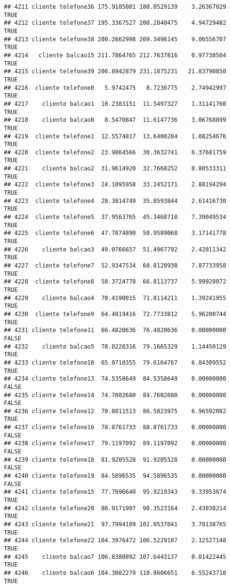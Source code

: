 \documentclass[
]{article}
\begin{document}
\begin{verbatim}
## 4211 cliente telefone36 175.9185081 180.0529139    3.26367029     TRUE
## 4212 cliente telefone37 195.3367527 200.2840475    4.94729482     TRUE
## 4213 cliente telefone38 200.2662998 209.3496145    9.06556707     TRUE
## 4214   cliente balcao15 211.7864765 212.7637816    0.97730504     TRUE
## 4215 cliente telefone39 206.8942879 231.1875231   21.83790850     TRUE
## 4216  cliente telefone0   5.9742475   8.7236775    2.74942997     TRUE
## 4217    cliente balcao1  10.2383151  11.5497327    1.31141760     TRUE
## 4218    cliente balcao0   8.5470847  11.6147736    3.06768899     TRUE
## 4219  cliente telefone1  12.5574817  13.6400284    1.08254676     TRUE
## 4220  cliente telefone2  23.9864566  30.3632741    6.37681759     TRUE
## 4221    cliente balcao2  31.9614920  32.7668252    0.80533311     TRUE
## 4222  cliente telefone3  24.1095958  33.2452171    2.88194294     TRUE
## 4223  cliente telefone4  28.3814749  35.8593844    2.61416730     TRUE
## 4224  cliente telefone5  37.9563765  45.3468718    7.39049534     TRUE
## 4225  cliente telefone6  47.7874890  50.9589068    3.17141778     TRUE
## 4226    cliente balcao3  49.0766657  51.4967792    2.42011342     TRUE
## 4227  cliente telefone7  52.9347534  60.8120930    7.87733958     TRUE
## 4228  cliente telefone8  58.3724778  66.8113737    5.99928072     TRUE
## 4229    cliente balcao4  70.4190015  71.8114211    1.39241955     TRUE
## 4230  cliente telefone9  64.4819416  72.7733812    5.96200744     TRUE
## 4231 cliente telefone11  66.4820636  76.4820636    0.00000000    FALSE
## 4232    cliente balcao5  78.0220316  79.1665329    1.14450129     TRUE
## 4233 cliente telefone10  65.0710355  79.6164767    6.84309552     TRUE
## 4234 cliente telefone13  74.5358649  84.5358649    0.00000000    FALSE
## 4235 cliente telefone14  74.7602680  84.7602680    0.00000000    FALSE
## 4236 cliente telefone12  70.8011513  86.5823975    6.96592082     TRUE
## 4237 cliente telefone16  78.8761733  88.8761733    0.00000000    FALSE
## 4238 cliente telefone17  79.1197092  89.1197092    0.00000000    FALSE
## 4239 cliente telefone18  81.9205528  91.9205528    0.00000000    FALSE
## 4240 cliente telefone19  84.5896535  94.5896535    0.00000000    FALSE
## 4241 cliente telefone15  77.7696640  95.9219343    9.33953674     TRUE
## 4242 cliente telefone20  86.9171997  98.3523164    2.43038214     TRUE
## 4243 cliente telefone21  97.7994109 102.0537041    3.70138765     TRUE
## 4244 cliente telefone22 104.3976472 106.5229187    2.12527148     TRUE
## 4245    cliente balcao7 106.8300892 107.6443137    0.81422445     TRUE
## 4246    cliente balcao6 104.3082279 110.8606651    6.55243718     TRUE

\end{verbatim}
\end{document}
